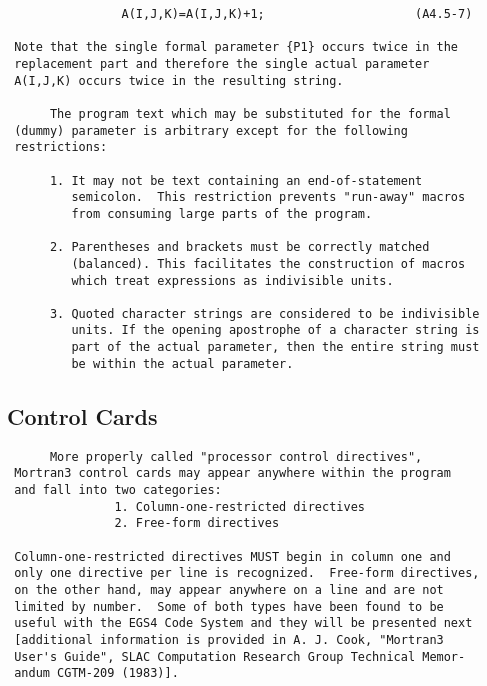 \begin{verbatim}
                A(I,J,K)=A(I,J,K)+1;                     (A4.5-7)
 
 Note that the single formal parameter {P1} occurs twice in the
 replacement part and therefore the single actual parameter
 A(I,J,K) occurs twice in the resulting string.
 
      The program text which may be substituted for the formal
 (dummy) parameter is arbitrary except for the following
 restrictions:
 
      1. It may not be text containing an end-of-statement
         semicolon.  This restriction prevents "run-away" macros
         from consuming large parts of the program.
 
      2. Parentheses and brackets must be correctly matched
         (balanced). This facilitates the construction of macros
         which treat expressions as indivisible units.
 
      3. Quoted character strings are considered to be indivisible
         units. If the opening apostrophe of a character string is
         part of the actual parameter, then the entire string must
         be within the actual parameter.
 \end{verbatim}
 \subsection{Control Cards}
 \begin{verbatim}
      More properly called "processor control directives",
 Mortran3 control cards may appear anywhere within the program
 and fall into two categories:
               1. Column-one-restricted directives
               2. Free-form directives
 
 Column-one-restricted directives MUST begin in column one and
 only one directive per line is recognized.  Free-form directives,
 on the other hand, may appear anywhere on a line and are not
 limited by number.  Some of both types have been found to be
 useful with the EGS4 Code System and they will be presented next
 [additional information is provided in A. J. Cook, "Mortran3
 User's Guide", SLAC Computation Research Group Technical Memor-
 andum CGTM-209 (1983)].
 \end{verbatim}
